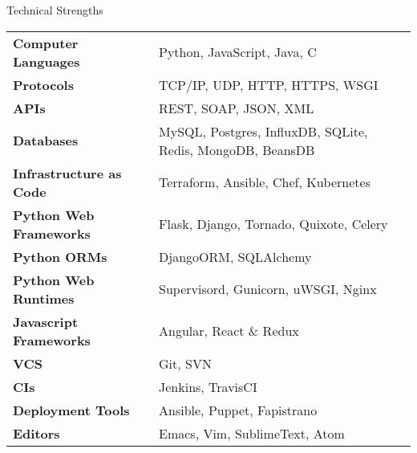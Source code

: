 \documentclass{resume}
\begin{document}
  \begin{rSection}{Technical Strengths}
    \begin{tabular}{ @{} >{\bfseries}l @{\hspace{6ex}} l }
      Computer Languages & Python, JavaScript, Java, C \\
      Protocols & TCP/IP, UDP, HTTP, HTTPS, WSGI \\
      APIs & REST, SOAP, JSON, XML \\
      Databases & MySQL, Postgres, InfluxDB, SQLite, Redis, MongoDB, BeansDB \\
      Infrastructure as Code & Terraform, Ansible, Chef, Kubernetes \\
      Python Web Frameworks & Flask, Django, Tornado, Quixote, Celery \\
      Python ORMs & DjangoORM, SQLAlchemy \\
      Python Web Runtimes & Supervisord, Gunicorn, uWSGI, Nginx \\
      Javascript Frameworks & Angular, React \& Redux \\
      VCS & Git, SVN \\
      CIs & Jenkins, TravisCI \\
      Deployment Tools & Ansible, Puppet, Fapistrano \\
      Editors & Emacs, Vim, SublimeText, Atom \\
    \end{tabular}
  \end{rSection}
\end{document}
